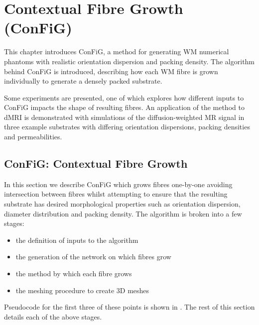 \chapter{Contextual Fibre Growth (ConFiG)}
\label{sec:config}

\chaptertoc{}

\begin{chapterabstract}
  This chapter introduces \acf{ConFiG}, a method for generating \acf{WM} numerical phantoms with realistic orientation dispersion and packing density.
  The algorithm behind \ac{ConFiG} is introduced, describing how each \ac{WM} fibre is grown individually to generate a densely packed substrate.
  
  Some experiments are presented, one of which explores how different inputs to \ac{ConFiG} impacts the shape of resulting fibres. 
  An application of the method to dMRI is demonstrated with simulations of the diffusion-weighted MR signal in three example substrates with differing orientation dispersions, packing densities and permeabilities.
\end{chapterabstract}


\section{ConFiG: Contextual Fibre Growth}
\label{sec:fibre_growth_algorithm}
In this section we describe ConFiG  which grows fibres one-by-one avoiding intersection between fibres whilst attempting to ensure that the resulting substrate has desired morphological properties such as orientation dispersion, diameter distribution and packing density.
The algorithm is broken into a few stages:
\begin{itemize}
\item the definition of inputs to the algorithm
\item the generation of the network on which fibres grow
\item the method by which each fibre grows
\item the meshing procedure to create 3D meshes
\end{itemize}
Pseudocode for the first three of these points is shown in . The rest of this section details each of the above stages.

